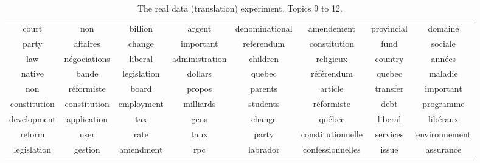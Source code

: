 \documentclass{article}
\begin{document}
\begin{table*}[h!]
\begin{tabular}{cc|cc|cc|cc}
                 court &                  non &               billion &               argent &        denominational &           amendement &            provincial &              domaine  \\ 
                 party &             affaires &                change &            important &            referendum &         constitution &                  fund &              sociale  \\ 
                   law &        n\'egociations &               liberal &       administration &              children &            religieux &               country &              ann\'ees  \\ 
                native &                bande &           legislation &              dollars &                quebec &         r\'ef\'erendum &                quebec &              maladie  \\ 
                   non &          r\'eformiste &                 board &               propos &               parents &              article &              transfer &            important  \\ 
          constitution &         constitution &            employment &            milliards &              students &          r\'eformiste &                  debt &            programme  \\ 
           development &          application &                   tax &                 gens &                change &              qu\'ebec &               liberal &            lib\'eraux  \\ 
                reform &                 user &                  rate &                 taux &                 party &    constitutionnelle &              services &        environnement  \\ 
           legislation &              gestion &             amendment &                  rpc &              labrador &     confessionnelles &                 issue &            assurance  \\ 
 \end{tabular}
\caption{ The real data (translation) experiment. Topics 9 to 12. } 
\label{tab:3}
\end{table*}
\setlength{\textfloatsep}{9pt}
\end{document}
